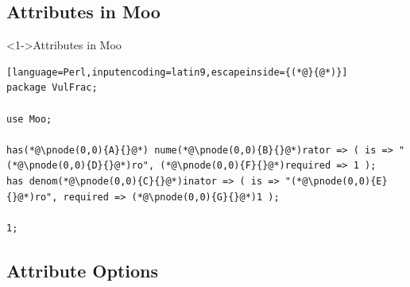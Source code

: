 \documentclass[ngerman,xcolor={table,dvipsnames},smaller,compress,hyperref={bookmarks,colorlinks}]{beamer}
\begin{document}
\subsection{Attributes in Moo}

\begin{frame}[t,fragile]

\begin{block}<1->{Attributes in Moo}
\begin{lstlisting}[language=Perl,inputencoding=latin9,escapeinside={(*@}{@*)}]
package VulFrac;

use Moo;

has(*@\pnode(0,0){A}{}@*) nume(*@\pnode(0,0){B}{}@*)rator => ( is => "(*@\pnode(0,0){D}{}@*)ro", (*@\pnode(0,0){F}{}@*)required => 1 );
has denom(*@\pnode(0,0){C}{}@*)inator => ( is => "(*@\pnode(0,0){E}{}@*)ro", required => (*@\pnode(0,0){G}{}@*)1 );

1;
\end{lstlisting}
\end{block}

\begin{itemize}
\end{itemize}

\end{frame}

\subsection{Attribute Options}
\end{document}
